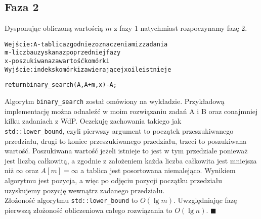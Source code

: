 \documentclass[a4paper,12pt]{article}
\begin{document}
\subsection*{Faza 2}
Dysponując obliczoną wartością $m$ z fazy 1 natychmiast rozpoczynamy fazę 2.
\begin{alltt}
 Wejście: A - tablica zgodnie z oznaczeniami z zadania
          m - liczba uzyskana z poprzedniej fazy
          x - poszukiwana zawartość komórki
 Wyjście: indeks komórki zawierającej x o ile istnieje
 
 return binary_search(A,A+m,x)-A;
\end{alltt}
Algorytm \verb|binary_search| został omówiony na wykładzie. Przykładową implementację można odnaleźć w moim rozwiązaniu zadań A i B oraz conajmniej kilku zadaniach z WdP.
Oczekuję zachowania takiego jak\\
\verb|std::lower_bound|, czyli pierwszy argument to początek przeszukiwanego przedziału, drugi to koniec przeszukiwanego przedziału, trzeci to poszukiwana wartość. Poszukiwana wartość jeżeli istnieje to jest w tym przedziale ponieważ jest liczbą całkowitą, a zgodnie z założeniem każda liczba całkowita jest mniejsza niż $\infty$ oraz $A[m]=\infty$ a tablica jest posortowana niemalejąco. Wynikiem algorytmu jest pozycja, a więc po odjęciu pozycji początku przedziału uzyskujemy pozycję wewnątrz zadanego przedziału.\\
Złożoność algorytmu \verb|std::lower_bound| to $O(\lg{m})$. Uwzględniając fazę\\
pierwszą złożoność obliczeniowa całego rozwiązania to $O(\lg{n})$. $\blacksquare$
\end{document}
